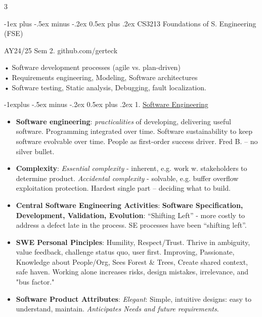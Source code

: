\documentclass[a4paper, 10pt, landscape]{article}
\makeatletter
\renewcommand{\section}{\@startsection{section}{1}{0mm}%
                                {-1ex plus -.5ex minus -.2ex}%
                                {0.5ex plus .2ex}%
                                {\normalfont\large\bfseries}}
\renewcommand{\subsection}{\@startsection{subsection}{2}{0mm}%
                                {-1explus -.5ex minus -.2ex}%
                                {0.5ex plus .2ex}%
                                {\normalfont\normalsize\bfseries}}
\makeatother
\begin{document}
\raggedright
\footnotesize
\begin{multicols*}{3}

\setlength{\columnseprule}{0pt}
\setlength{\premulticols}{1pt}
\setlength{\postmulticols}{1pt}
\setlength{\multicolsep}{2pt}
\setlength{\columnsep}{2pt}

\section{CS3213 Foundations of S. Engineering (FSE)}
\centerline{AY24/25 Sem 2. github.com/gerteck}
• Software development processes (agile vs. plan-driven) \\
• Requirements engineering, Modeling, Software architectures \\ 
• Software testing, Static analysis, Debugging, fault localization. 

\subsection{1. \underline{Software Engineering}}
\begin{itemize}
\item \textbf{Software engineering}: \textit{practicalities} of developing, delivering useful software. Programming integrated over time. Software sustainability to keep software evolvable over time. People as first-order success driver.  Fred B. -- no silver bullet.
\item \textbf{Complexity}: \textit{Essential complexity} - inherent, e.g. work w. stakeholders to determine product. \textit{Accidental complexity} - solvable, e.g. buffer overflow exploitation protection. Hardest single part -- deciding what to build. 
\item \textbf{Central Software Engineering Activities}: \textbf{Software Specification, Development, Validation, Evolution}: “Shifting Left” - more costly to address a defect late in the process. SE processes have been “shifting left”.
\item \textbf{SWE Personal Pinciples}: Humility, Respect/Trust. Thrive in ambiguity, value feedback, challenge status quo, user first. Improving, Passionate, Knowledge about People/Org, Sees Forest \& Trees, Create shared context, safe haven. Working alone increases risks, design mistakes, irrelevance, and "bus factor."
\item \textbf{Software Product Attributes}: \textit{Elegant}: Simple, intuitive designs: easy to understand, maintain. \textit{Anticipates Needs and future requirements}.
\end{itemize}


\end{multicols*}
\end{document}
